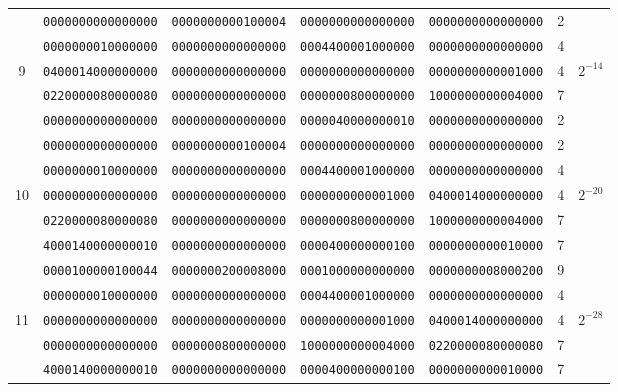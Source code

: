 \begin{table}[!tb]
\begin{center}
{\begin{tabular}{ccccccc}
      & {\tt 0000000000000000} & {\tt 0000000000100004} & {\tt 0000000000000000} & {\tt 0000000000000000} & 2  & \\
      & {\tt 0000000010000000} & {\tt 0000000000000000} & {\tt 0004400001000000} & {\tt 0000000000000000} & 4  & \\
9     & {\tt 0400014000000000} & {\tt 0000000000000000} & {\tt 0000000000000000} & {\tt 0000000000001000} & 4  & $2^{-14}$\\
      & {\tt 0220000080000080} & {\tt 0000000000000000} & {\tt 0000000800000000} & {\tt 1000000000004000} & 7  & \\
      & {\tt 0000000000000000} & {\tt 0000000000000000} & {\tt 0000040000000010} & {\tt 0000000000000000} & 2  & \\ \hline

      & {\tt 0000000000000000} & {\tt 0000000000100004} & {\tt 0000000000000000} & {\tt 0000000000000000} & 2  & \\
      & {\tt 0000000010000000} & {\tt 0000000000000000} & {\tt 0004400001000000} & {\tt 0000000000000000} & 4  & \\
10    & {\tt 0000000000000000} & {\tt 0000000000000000} & {\tt 0000000000001000} & {\tt 0400014000000000} & 4  & $2^{-20}$\\
      & {\tt 0220000080000080} & {\tt 0000000000000000} & {\tt 0000000800000000} & {\tt 1000000000004000} & 7  & \\
      & {\tt 4000140000000010} & {\tt 0000000000000000} & {\tt 0000400000000100} & {\tt 0000000000010000} & 7  & \\ \hline

      & {\tt 0000100000100044} & {\tt 0000000200008000} & {\tt 0001000000000000} & {\tt 0000000008000200} & 9  & \\
      & {\tt 0000000010000000} & {\tt 0000000000000000} & {\tt 0004400001000000} & {\tt 0000000000000000} & 4  & \\
11    & {\tt 0000000000000000} & {\tt 0000000000000000} & {\tt 0000000000001000} & {\tt 0400014000000000} & 4  & $2^{-28}$\\
      & {\tt 0000000000000000} & {\tt 0000000800000000} & {\tt 1000000000004000} & {\tt 0220000080000080} & 7  & \\
      & {\tt 4000140000000010} & {\tt 0000000000000000} & {\tt 0000400000000100} & {\tt 0000000000010000} & 7  & \\ \hline


\end{tabular}}
\end{center}
\end{table}
